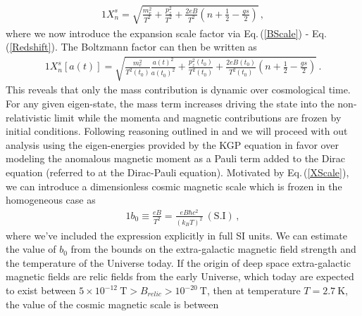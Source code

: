 \documentclass[universe,article,submit,moreauthors,pdftex,a4paper]{Definitions/mdpi}
\newcommand{\req}[1]{Eq.\,(\ref{#1})}
\begin{document}
\begin{alignat}{1}
    \label{XExplicit} X_{n}^{s} = \sqrt{\frac{m_{e}^{2}}{T^{2}}+\frac{p_{z}^{2}}{T^{2}}+\frac{2eB}{T^{2}}\left(n+\frac{1}{2}-\frac{gs}{2}\right)}\,,
\end{alignat}
where we now introduce the expansion scale factor via \req{BScale} - \req{Redshift}. The Boltzmann factor can then be written as
\begin{alignat}{1}
    \label{XScale} X_{n}^{s}[a(t)] = \sqrt{\frac{m_{e}^{2}}{T^{2}(t_{0})}\frac{a(t)^{2}}{a(t_{0})^{2}}+\frac{p_{z}^{2}(t_{0})}{T^{2}(t_{0})}+\frac{2eB(t_{0})}{T^{2}(t_{0})}\left(n+\frac{1}{2}-\frac{gs}{2}\right)}\,.
\end{alignat}
This reveals that only the mass contribution is dynamic over cosmological time. For any given eigen-state, the mass term increases driving the state into the non-relativistic limit while the momenta and magnetic contributions are frozen by initial conditions.
Following reasoning outlined in \cite{Rafelski:2022bsv} and \cite{Steinmetz:2018ryf} we will proceed with out analysis using the eigen-energies provided by the KGP equation in favor over modeling the anomalous magnetic moment as a Pauli term added to the Dirac equation (referred to at the Dirac-Pauli equation). Motivated by \req{XScale}, we can introduce a dimensionless cosmic magnetic scale which is frozen in the homogeneous case as
\begin{alignat}{1}
    \label{Bo} b_{0}\equiv\frac{eB}{T^{2}}=\frac{eB\hbar c^{2}}{(k_{B}T)^{2}}\ \mathrm{(S.I)}\,,
\end{alignat}
where we've included the expression explicitly in full SI units. We can estimate the value of $b_{0}$ from the bounds on the extra-galactic magnetic field strength and the temperature of the Universe today.  If the origin of deep space extra-galactic magnetic fields are relic fields from the early Universe, which today are expected to exist between $5\times10^{-12}\ \mathrm{T}>B_{relic}>10^{-20}\ \mathrm{T}$, then at temperature $T=2.7\ \mathrm{K}$, the value of the cosmic magnetic scale is between
\end{document}
